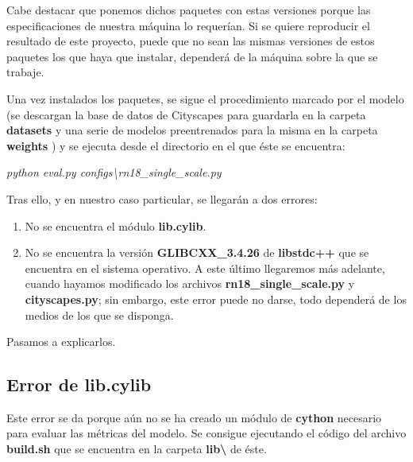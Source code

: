 Cabe destacar que ponemos dichos paquetes con estas versiones porque las especificaciones de nuestra máquina lo requerían. Si se quiere reproducir el resultado de este proyecto, puede que no sean las mismas versiones de estos paquetes los que haya que instalar, dependerá de la máquina sobre la que se trabaje.

Una vez instalados los paquetes, se sigue el procedimiento marcado por el modelo (se descargan la base de datos de Cityscapes \cite{cityscapes} para guardarla en la carpeta \textbf{datasets} y una serie de modelos preentrenados para la misma en la carpeta \textbf{weights} \cite{github_swiftnet}) y se ejecuta desde el directorio en el que éste se encuentra:

\begin{center}
\textit{python eval.py configs\textbackslash{rn18\_single\_scale.py}}
\end{center}

Tras ello, y en nuestro caso particular, se llegarán a dos errores:

\begin{enumerate}
\item No se encuentra el módulo \textbf{lib.cylib}.
\item No se encuentra la versión \textbf{GLIBCXX\_3.4.26} de \textbf{libstdc++} que se encuentra en el sistema operativo. A este último llegaremos más adelante, cuando hayamos modificado los archivos \textbf{rn18\_single\_scale.py} y \textbf{cityscapes.py}; sin embargo, este error puede no darse, todo dependerá de los medios de los que se disponga.
\end{enumerate}

Pasamos a explicarlos.

\subsection{Error de lib.cylib}

Este error se da porque aún no se ha creado un módulo de \textbf{cython} \cite{cython} necesario para evaluar las métricas del modelo. Se consigue ejecutando el código del archivo \textbf{build.sh} que se encuentra en la carpeta \textbf{lib\textbackslash{}} de éste.

